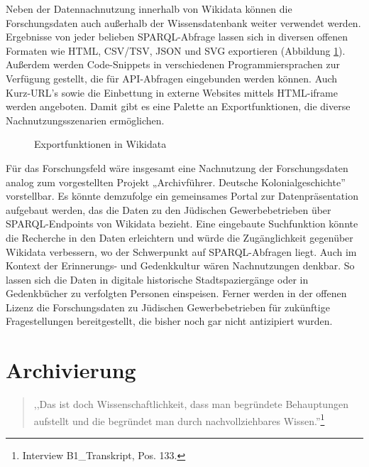 Neben der Datennachnutzung innerhalb von Wikidata können die Forschungsdaten auch außerhalb der Wissensdatenbank weiter verwendet werden. Ergebnisse von jeder belieben SPARQL-Abfrage lassen sich in diversen offenen Formaten wie HTML, CSV/TSV, JSON und SVG exportieren (Abbildung \ref{fig:wikidataexport}). Außerdem werden Code-Snippets in verschiedenen Programmiersprachen zur Verfügung gestellt, die für API-Abfragen eingebunden werden können. Auch Kurz-URL's sowie die Einbettung in externe Websites mittels HTML-iframe werden angeboten. Damit gibt es eine Palette an Exportfunktionen, die diverse Nachnutzungsszenarien ermöglichen.

\begin{figure}[h]
    \centering
    \caption{Exportfunktionen in Wikidata}
    \label{fig:wikidataexport}
\end{figure}

Für das Forschungsfeld wäre insgesamt eine Nachnutzung der Forschungsdaten analog zum vorgestellten Projekt „Archivführer. Deutsche Kolonialgeschichte'' vorstellbar. Es könnte demzufolge ein gemeinsames Portal zur Datenpräsentation aufgebaut werden, das die Daten zu den Jüdischen Gewerbebetrieben über SPARQL-Endpoints von Wikidata bezieht. Eine eingebaute Suchfunktion könnte die Recherche in den Daten erleichtern und würde die Zugänglichkeit gegenüber Wikidata verbessern, wo der Schwerpunkt auf SPARQL-Abfragen liegt. Auch im Kontext der Erinnerungs- und Gedenkkultur wären Nachnutzungen denkbar. So lassen sich die Daten in digitale historische Stadtspaziergänge oder in Gedenkbücher zu verfolgten Personen einspeisen. Ferner werden in der offenen Lizenz die Forschungsdaten zu Jüdischen Gewerbebetrieben für zukünftige Fragestellungen bereitgestellt, die bisher noch gar nicht antizipiert wurden.

\section{Archivierung}

\begin{quote}
    ,,Das ist doch Wissenschaftlichkeit, dass man begründete Behauptungen aufstellt und die begründet man durch nachvollziehbares Wissen.''\footnote{Interview B1\_Transkript, Pos. 133.}
\end{quote}

